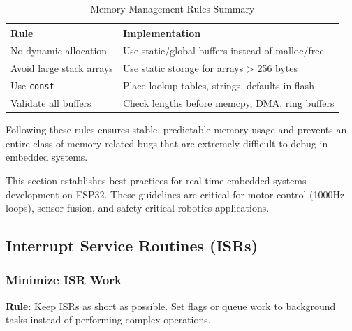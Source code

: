 \begin{table}[H]
\centering
\caption{Memory Management Rules Summary}
\label{tab:memory-rules-summary}
\begin{tabular}{|l|p{9cm}|}
\hline
\textbf{Rule} & \textbf{Implementation} \\
\hline
No dynamic allocation & Use static/global buffers instead of malloc/free \\
\hline
Avoid large stack arrays & Use static storage for arrays > 256 bytes \\
\hline
Use \texttt{const} & Place lookup tables, strings, defaults in flash \\
\hline
Validate all buffers & Check lengths before memcpy, DMA, ring buffers \\
\hline
\end{tabular}
\end{table}

Following these rules ensures stable, predictable memory usage and prevents an entire class of memory-related bugs that are extremely difficult to debug in embedded systems.


This section establishes best practices for real-time embedded systems development on ESP32. These guidelines are critical for motor control (1000Hz loops), sensor fusion, and safety-critical robotics applications.

\subsection{Interrupt Service Routines (ISRs)}

\subsubsection{Minimize ISR Work}

\textbf{Rule}: Keep ISRs as short as possible. Set flags or queue work to background tasks instead of performing complex operations.

